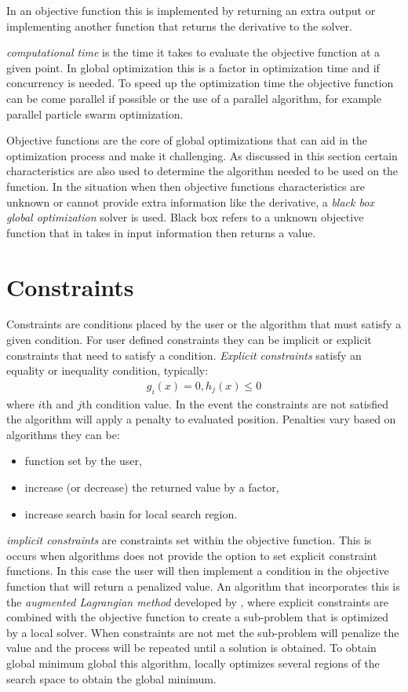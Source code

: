In an objective function this is implemented by returning an extra output or implementing another function that returns the derivative to the solver. 

\textit{computational time} is the time it takes to evaluate the objective function at a given point. In global optimization this is a factor in optimization time and if concurrency is needed. To speed up the optimization time the objective function can be come parallel if possible or the use of a parallel algorithm, for example parallel particle swarm optimization. 

Objective functions are the core of global optimizations that can aid in the optimization process and make it challenging. As discussed in this section certain characteristics are also used to determine the algorithm needed to be used on the function. In the situation when then objective functions characteristics are unknown or cannot provide extra information like the derivative, a \textit{black box global
optimization} solver is used. Black box refers to a unknown objective function that in takes in input information then returns a value.  


\section{Constraints}
Constraints are conditions placed by the user or the algorithm that must satisfy a given condition. For user defined constraints they can be implicit or explicit constraints that need to satisfy a condition. \textit{Explicit constraints} satisfy an equality or inequality condition, typically:
\begin{align}
    \label{eq:constraints}
    g_i(x) = 0, 
    h_j(x) \leq 0 
\end{align}
where $i$th and $j$th condition value. In the event the constraints are not satisfied the algorithm will apply a penalty to evaluated position. Penalties vary based on algorithms they can be:
\begin{itemize}
    \item function set by the user,
    \item increase (or decrease) the returned value by a factor, 
    \item increase search basin for local search region.
\end{itemize}

\textit{implicit constraints} are constraints set within the objective function. This is occurs when algorithms does not provide the option to set explicit constraint functions. In this case the user will then implement a condition in the objective function that will return a penalized value. An algorithm that incorporates this is the \textit{augmented Lagrangian method} developed by \cite{}, where explicit constraints are combined with the objective function to create a
sub-problem that is optimized by a local solver. When constraints are not met the sub-problem will penalize the value and the process will be repeated until a solution is obtained. To obtain global minimum global this algorithm, locally optimizes several regions of the search space to obtain the global minimum.


